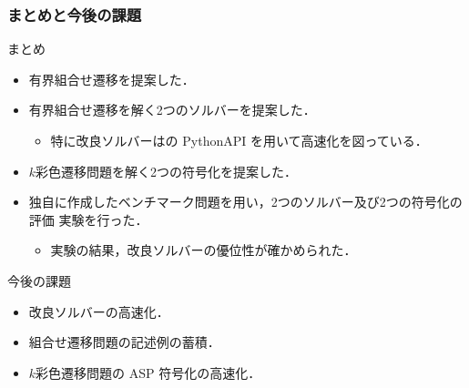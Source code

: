 \documentclass[dvipdfmx,11pt]{beamer}
\begin{document}

\begin{frame}\frametitle{まとめと今後の課題}

  \begin{block}{まとめ}
    \begin{itemize}
      \item 有界組合せ遷移を提案した．
      \item 有界組合せ遷移を解く2つのソルバーを提案した．
      \begin{itemize}
        \item 特に改良ソルバーは{\clingo}の PythonAPI を用いて高速化を図っている．
      \end{itemize}
      \item $k$彩色遷移問題を解く2つの符号化を提案した．
      \item 独自に作成したベンチマーク問題を用い，2つのソルバー及び2つの符号化の評価
            実験を行った．
      \begin{itemize}
        \item 実験の結果，改良ソルバーの優位性が確かめられた．
      \end{itemize}
    \end{itemize}
  \end{block}
  
  \begin{alertblock}{今後の課題}
    \begin{itemize}
      \item 改良ソルバーの高速化．
      \item 組合せ遷移問題の記述例の蓄積．
      \item $k$彩色遷移問題の ASP 符号化の高速化．
    \end{itemize}
  \end{alertblock}

\end{frame}



\end{document}
